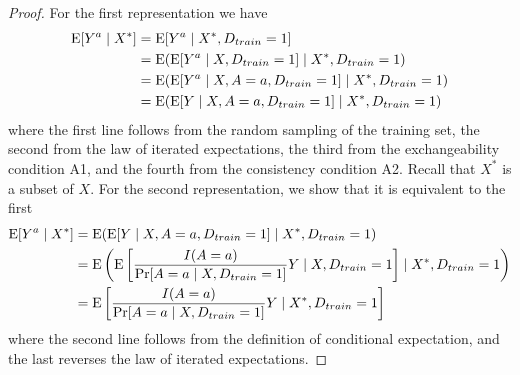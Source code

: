     \begin{proof}
        For the first representation we have 
        \begin{align*}
            \operatorname{E}[Y^a \mid X^*] & = \operatorname{E}[Y^a \mid X^*, D_{train} = 1] \\
            & = \operatorname{E}(\operatorname{E}[Y^a\mid X, D_{train} = 1] \mid X^*, D_{train} = 1) \\
            & = \operatorname{E}(\operatorname{E}[Y^a\mid X, A = a, D_{train} = 1] \mid X^*, D_{train} = 1) \\
            & = \operatorname{E}(\operatorname{E}[Y \mid X, A = a, D_{train} = 1] \mid X^*, D_{train} = 1) 
        \end{align*}
        where the first line follows from the random sampling of the training set, the second from the law of iterated expectations, the third from the exchangeability condition A1, and the fourth from the consistency condition A2. Recall that $X^*$ is a subset of $X$. For the second representation, we show that it is equivalent to the first 
        \begin{align*}
            \operatorname{E}[Y^a \mid X^*] &= \operatorname{E}(\operatorname{E}[Y \mid X, A = a, D_{train} = 1] \mid X^*, D_{train} = 1)  \\
            &= \operatorname{E}\left(\operatorname{E}\left[\frac{I(A = a)}{\Pr[A = a \mid X,D_{train} = 1]}Y \mid X,D_{train} = 1\right] \mid X^*, D_{train} = 1\right)\\
            &= \operatorname{E}\left[\frac{I(A = a)}{\Pr[A = a \mid X,D_{train} = 1]}Y \mid X^*, D_{train} = 1\right]
        \end{align*}
        where the second line follows from the definition of conditional expectation, and the last reverses the law of iterated expectations.
    \end{proof}

